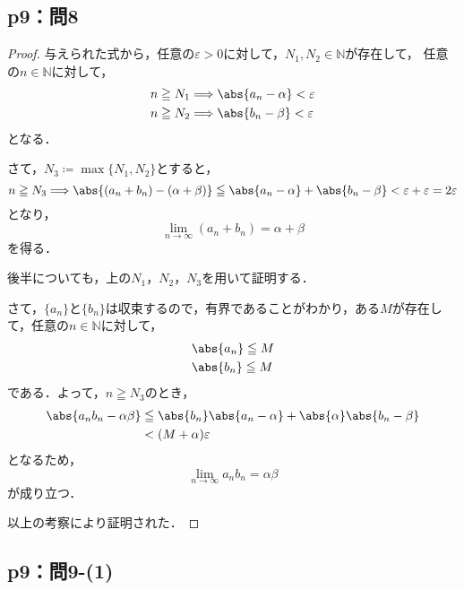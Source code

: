 \documentclass[uplatex,dvipdfmx,a4paper,10pt,fleqn]{jsarticle}
\begin{document}
    \subsection*{p9：問8}

    \begin{tleftbar}
        \begin{proof}
        与えられた式から，任意の$\varepsilon >0$に対して，$N_1 , N_2 \in \mathbb{N}$が存在して，
        任意の$n \in \mathbb{N}$に対して，
        \begin{align*} 
            & n \geqq N_1 \Longrightarrow \abs{a_n - \alpha}<\varepsilon \\
            & n \geqq N_2 \Longrightarrow \abs{b_n - \beta}<\varepsilon 
        \end{align*} 
        となる．

        さて，$N_3 \coloneqq \max \{ N_1 , N_2 \}$とすると，
        \[
           n \geqq N_3  \Longrightarrow \abs{(a_n+b_n)-(\alpha + \beta) } \leqq  \abs{a_n - \alpha}+\abs{b_n-\beta}<\varepsilon +\varepsilon=2\varepsilon 
         \]
         となり，
         \[
            \lim_{n \to \infty} (a_n + b_n)= \alpha + \beta
         \]
         を得る．

         後半についても，上の$N_1$，$N_2$，$N_3$を用いて証明する．

         さて，$\{ a_n \}$と$\{ b_n \}$は収束するので，有界であることがわかり，ある$M$が存在して，任意の$n \in \mathbb{N}$に対して，
         \begin{align*} 
            &\abs{a_n} \leqq M \\
            & \abs{b_n} \leqq M 
         \end{align*} 
         である．よって，$n \geqq N_3$のとき，
         \begin{align*} 
            \abs{a_n b_n - \alpha \beta} & \leqq \abs{b_n} \abs{a_n -\alpha } + \abs{\alpha} \abs{b_n -\beta} \\
            & < (M+\alpha )\varepsilon 
         \end{align*} 
         となるため，
         \[
            \lim_{n \to \infty} a_n b_n = \alpha \beta
         \]
         が成り立つ．

         以上の考察により証明された．
        \end{proof}
        \end{tleftbar}



    \subsection*{p9：問9-(1)}
\end{document}
